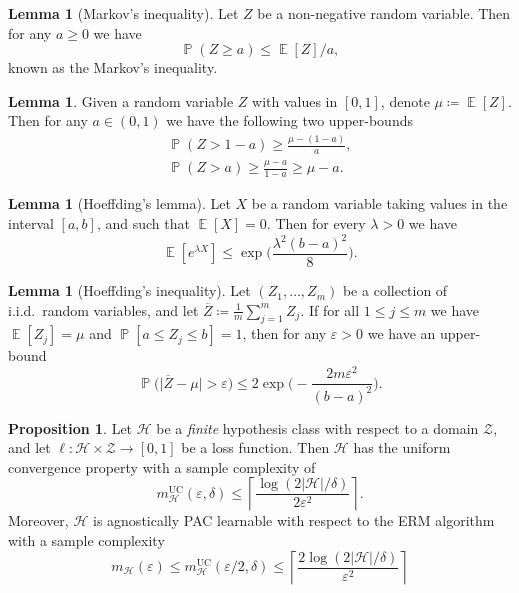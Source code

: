 \documentclass[11pt, reqno]{amsart}
\theoremstyle{definition}
\newtheorem{proposition}[theorem]{Proposition}
\newtheorem{lemma}[theorem]{Lemma}
\renewcommand{\leq}{\leqslant}
\renewcommand{\geq}{\geqslant}
\DeclareMathOperator{\Prob}{\mathbb{P}} %
\DeclareMathOperator{\Expect}{\mathbb{E}} %
\begin{document}
\begin{lemma}[Markov's inequality]
\label{lem:markov-inequality}
Let \(Z\) be a non-negative random variable. Then for any \(a \geq 0\) we have
\[
\Prob(Z \geq a) \leq \Expect[Z] / a,
\]
known as the Markov's inequality.
\end{lemma}

\begin{lemma}
\label{lem:markov-inequality-lemma}
Given a random variable \(Z\) with values in \([0, 1]\), denote \(\mu \coloneq
\Expect[Z]\). Then for any \(a \in (0, 1)\) we have the following two upper-bounds
\begin{gather}
  \Prob(Z > 1 - a) \geq \frac{\mu - (1 - a)}{a}, \\
  \Prob(Z > a) \geq \frac{\mu - a}{1 - a} \geq \mu - a.
\end{gather}
\end{lemma}

\begin{lemma}[Hoeffding's lemma]
\label{lem:hoeffding-lemma}
Let \(X\) be a random variable taking values in the interval \([a, b]\),
and such that \(\Expect[X] = 0\). Then for every \(\lambda > 0\) we have
\[
\Expect[e^{\lambda X}] \leq \exp\Big( \frac{\lambda^2 (b - a)^2}{8} \Big).
\]
\end{lemma}

\begin{lemma}[Hoeffding's inequality]
\label{lem:hoeffding-inequality}
Let \((Z_1, \dots, Z_m)\) be a collection of i.i.d.~random variables,
and let \(\overline Z \coloneq \frac{1}{m} \sum_{j=1}^m Z_j\).  If for
all \(1 \leq j \leq m\) we have \(\Expect[Z_j] = \mu\) and
\(\Prob[a \leq Z_j \leq b] = 1\), then for any \(\varepsilon > 0\) we have
an upper-bound
\[
\Prob\big( \big| \overline{Z} - \mu \big| > \varepsilon \big)
\leq 2 \exp\Big( -\frac{2 m \varepsilon^{2}}{(b - a)^2} \Big).
\]
\end{lemma}

\begin{proposition}
\label{prop:finite-hypothesis-agnostically-pac-learnable}
Let \(\mathcal{H}\) be a \emph{finite} hypothesis class with respect to a domain
\(\mathcal{Z}\), and let \(\ell: \mathcal{H} \times \mathcal{Z} \to [0, 1]\) be
a loss function. Then \(\mathcal{H}\) has the uniform convergence property with
a sample complexity of
\[
m_{\mathcal{H}}^{\text{UC}}(\varepsilon, \delta) \leq
\left\lceil \frac{\log(2 |\mathcal{H}| / \delta)}{2 \varepsilon^2} \right\rceil.
\]
Moreover, \(\mathcal{H}\) is agnostically PAC learnable with respect to the ERM
algorithm with a sample complexity
\[
m_{\mathcal{H}}(\varepsilon) \leq m_{\mathcal{H}}^{\text{UC}}(\varepsilon/2, \delta)
\leq
\left\lceil \frac{2 \log(2 |\mathcal{H}| / \delta)}{\varepsilon^2} \right\rceil
\]
\end{proposition}
\end{document}
